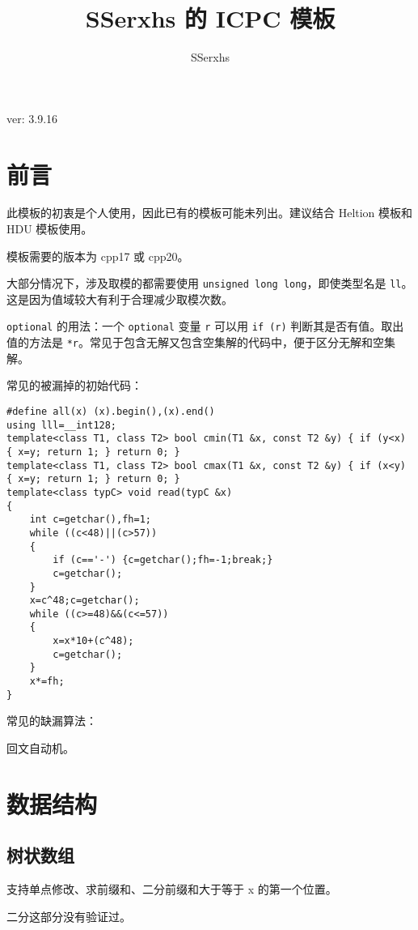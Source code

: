\documentclass[12pt]{ctexart}
\author{SSerxhs}
\title{SSerxhs 的 ICPC 模板}
\begin{document}
\maketitle

\centerline{ver: 3.9.16}

\tableofcontents

\newpage

\section{前言}

此模板的初衷是个人使用，因此已有的模板可能未列出。建议结合 Heltion 模板和 HDU 模板使用。

模板需要的版本为 cpp17 或 cpp20。

大部分情况下，涉及取模的都需要使用 \verb|unsigned long long|，即使类型名是 \verb|ll|。这是因为值域较大有利于合理减少取模次数。

\verb|optional| 的用法：一个 \verb|optional| 变量 \verb|r| 可以用 \verb|if (r)| 判断其是否有值。取出值的方法是 \verb|*r|。常见于包含无解又包含空集解的代码中，便于区分无解和空集解。

常见的被漏掉的初始代码：
\begin{lstlisting}
#define all(x) (x).begin(),(x).end()
using lll=__int128;
template<class T1, class T2> bool cmin(T1 &x, const T2 &y) { if (y<x) { x=y; return 1; } return 0; }
template<class T1, class T2> bool cmax(T1 &x, const T2 &y) { if (x<y) { x=y; return 1; } return 0; }
template<class typC> void read(typC &x)
{
	int c=getchar(),fh=1;
	while ((c<48)||(c>57))
	{
		if (c=='-') {c=getchar();fh=-1;break;}
		c=getchar();
	}
	x=c^48;c=getchar();
	while ((c>=48)&&(c<=57))
	{
		x=x*10+(c^48);
		c=getchar();
	}
	x*=fh;
}
\end{lstlisting}

常见的缺漏算法：

回文自动机。

\newpage

\section{数据结构}

\subsection{树状数组}

支持单点修改、求前缀和、二分前缀和大于等于 x 的第一个位置。

二分这部分没有验证过。
\end{document}
